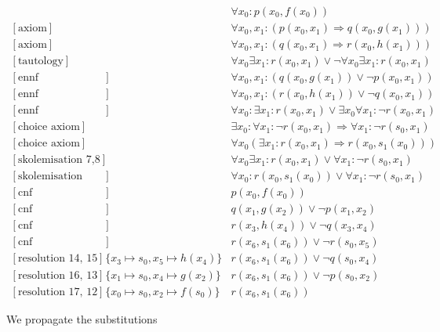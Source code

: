 \documentclass[onehalfspacing]{article}
\theoremstyle{definition}
\theoremstyle{definition}
\theoremstyle{definition}
\theoremstyle{definition}
\theoremstyle{definition}
\theoremstyle{definition}
\begin{document}
\setcounter{equation}{0}
\begin{align}
	[\text{axiom}] && \forall x_0: p(x_0,f(x_0))\\
	[\text{axiom}] && \forall x_0, x_1 : (p(x_0,x_1) \Rightarrow q(x_0,g(x_1)))\\
	[\text{axiom}] && \forall x_0, x_1 : (q(x_0,x_1) \Rightarrow r(x_0,h(x_1)))\\
	[\text{tautology}] &&\forall  x_0 \exists x_1 : r(x_0,x_1)\vee \neg\forall  x_0 \exists x_1 : r(x_0,x_1)\\
	[\text{ennf transformation 2}] && \forall x_0, x_1 : (q(x_0,g(x_1)) \vee \neg p(x_0,x_1)) \\
	[\text{ennf transformation 3}] &&\forall x_0, x_1 : (r(x_0,h(x_1)) \vee \neg q(x_0, x_1)) \\
	[\text{ennf transformation 4}] && \forall  x_0 : \exists x_1 : r(x_0,x_1)\vee \exists x_0 \forall x_1 : \neg r(x_0, x_1)\\
	[\text{choice axiom}] && \exists x_0 : \forall x_1 : \neg r(x_0, x_1) \Rightarrow \forall x_1 : \neg r(s_0,x_1)\\
	[\text{choice axiom}] &&\forall x_0(\exists x_1: r(x_0, x_1)\Rightarrow r(x_0, s_1(x_0)))\\
	[\text{skolemisation 7,8}] && \forall  x_0 \exists x_1 : r(x_0,x_1)\vee \forall x_1 : \neg r(s_0, x_1)\\
	[\text{skolemisation 9,10}] && \forall  x_0 :  r(x_0, s_1(x_0))\vee \forall x_1 : \neg r(s_0, x_1)\\
	[\text{cnf transformation 1}] && p(x_0,f(x_0))\\
	[\text{cnf transformation 5}] && q(x_1,g(x_2)) \vee \neg p(x_1, x_2)\\
	[\text{cnf transformation 6}] && r(x_3,h(x_4)) \vee \neg q(x_3, x_4)\\
	[\text{cnf transformation 11}] && r(x_6, s_1(x_6))\vee\neg r(s_0, x_5)\\
	[\text{resolution 14, 15}] &\{x_3\mapsto s_0, x_5\mapsto h(x_4)\}&r(x_6, s_1(x_6))\vee \neg q(s_0,x_4)\\
	[\text{resolution 16, 13}] &\{x_1\mapsto s_0, x_4\mapsto g(x_2)\}&r(x_6, s_1(x_6))\vee\neg p(s_0,x_2)\\
	[\text{resolution 17, 12}] &\{x_0\mapsto s_0, x_2\mapsto f(s_0)\}&r(x_6, s_1(x_6))
\end{align}

We propagate the substitutions
\end{document}
